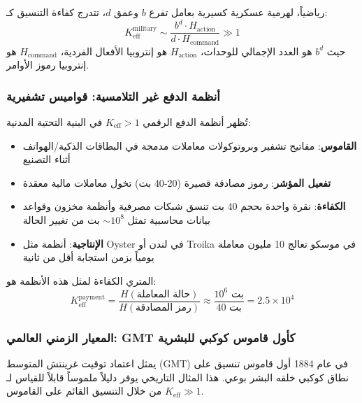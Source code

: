 \documentclass[11pt,a4paper]{article}
\begin{document}
	رياضياً، لهرمية عسكرية كسيرية بعامل تفرع $b$ وعمق $d$، تتدرج كفاءة التنسيق كـ:
	\begin{equation}
		K_{\mathrm{eff}}^{\text{military}} \sim \frac{b^d \cdot H_{\text{action}}}{d \cdot H_{\text{command}}} \gg 1
	\end{equation}
	حيث $b^d$ هو العدد الإجمالي للوحدات، $H_{\text{action}}$ هو إنتروبيا الأفعال الفردية، $H_{\text{command}}$ هو إنتروبيا رموز الأوامر.
	
	\subsubsection{أنظمة الدفع غير التلامسية: قواميس تشفيرية}
	تُظهر أنظمة الدفع الرقمي $K_{\mathrm{eff}} > 1$ في البنية التحتية المدنية:
	\begin{itemize}
		\item \textbf{القاموس}: مفاتيح تشفير وبروتوكولات معاملات مدمجة في البطاقات الذكية/الهواتف أثناء التصنيع
		\item \textbf{تفعيل المؤشر}: رموز مصادقة قصيرة (20-40 بت) تخول معاملات مالية معقدة
		\item \textbf{الكفاءة}: نقرة واحدة بحجم 40 بت تنسق شبكات مصرفية وأنظمة مخزون وقواعد بيانات محاسبية تمثل $\sim 10^8$ بت من تغيير الحالة
		\item \textbf{الإنتاجية}: أنظمة مثل Oyster في لندن أو Troika في موسكو تعالج 10 مليون معاملة يومياً بزمن استجابة أقل من ثانية
	\end{itemize}
	
	المتري الكفاءة لمثل هذه الأنظمة هو:
	\begin{equation}
		K_{\mathrm{eff}}^{\text{payment}} = \frac{H(\text{حالة المعاملة})}{H(\text{رمز المصادقة})} \approx \frac{10^6 \text{ بت}}{40 \text{ بت}} = 2.5 \times 10^4
	\end{equation}
	
	\subsubsection{المعيار الزمني العالمي: GMT كأول قاموس كوكبي للبشرية}
	\label{subsec:gmt-dictionary}
	
	يمثل اعتماد توقيت غرينتش المتوسط (GMT) في عام 1884 أول قاموس تنسيق على نطاق كوكبي خلقه البشر بوعي. هذا المثال التاريخي يوفر دليلاً ملموساً قابلاً للقياس لـ $K_{\mathrm{eff}} \gg 1$ من خلال التنسيق القائم على القاموس.
	
\end{document}
